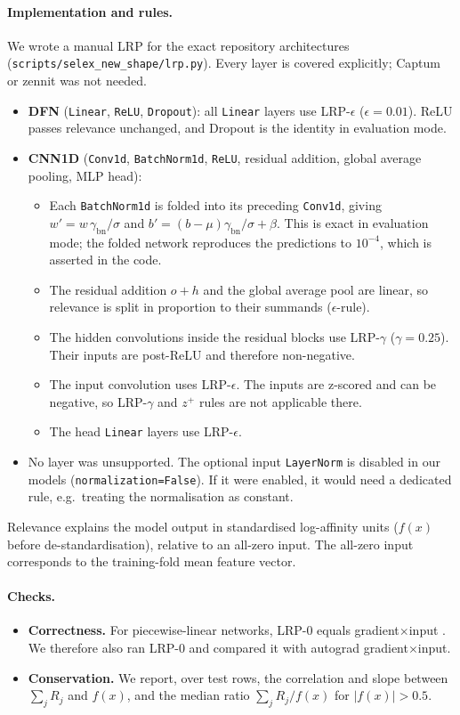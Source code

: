 \paragraph{Implementation and rules.} We wrote a manual LRP for the exact repository architectures (\texttt{scripts/selex\_new\_shape/lrp.py}). Every layer is covered explicitly; Captum or zennit was not needed.
\begin{itemize}
\item \textbf{DFN} (\texttt{Linear}, \texttt{ReLU}, \texttt{Dropout}): all \texttt{Linear} layers use LRP-$\epsilon$ ($\epsilon=0.01$). ReLU passes relevance unchanged, and Dropout is the identity in evaluation mode.
\item \textbf{CNN1D} (\texttt{Conv1d}, \texttt{BatchNorm1d}, \texttt{ReLU}, residual addition, global average pooling, MLP head):
  \begin{itemize}
  \item Each \texttt{BatchNorm1d} is folded into its preceding \texttt{Conv1d}, giving $w'=w\,\gamma_\mathrm{bn}/\sigma$ and $b'=(b-\mu)\gamma_\mathrm{bn}/\sigma+\beta$. This is exact in evaluation mode; the folded network reproduces the predictions to $10^{-4}$, which is asserted in the code.
  \item The residual addition $o+h$ and the global average pool are linear, so relevance is split in proportion to their summands ($\epsilon$-rule).
  \item The hidden convolutions inside the residual blocks use LRP-$\gamma$ ($\gamma=0.25$). Their inputs are post-ReLU and therefore non-negative.
  \item The input convolution uses LRP-$\epsilon$. The inputs are z-scored and can be negative, so LRP-$\gamma$ and $z^+$ rules are not applicable there.
  \item The head \texttt{Linear} layers use LRP-$\epsilon$.
  \end{itemize}
\item No layer was unsupported. The optional input \texttt{LayerNorm} is disabled in our models (\texttt{normalization=False}). If it were enabled, it would need a dedicated rule, e.g.\ treating the normalisation as constant.
\end{itemize}
Relevance explains the model output in standardised log-affinity units ($f(x)$ before de-standardisation), relative to an all-zero input. The all-zero input corresponds to the training-fold mean feature vector.

\paragraph{Checks.}
\begin{itemize}
\item \textbf{Correctness.} For piecewise-linear networks, LRP-0 equals gradient$\times$input \cite{ancona2018}. We therefore also ran LRP-0 and compared it with autograd gradient$\times$input.
\item \textbf{Conservation.} We report, over test rows, the correlation and slope between $\sum_j R_j$ and $f(x)$, and the median ratio $\sum_j R_j/f(x)$ for $|f(x)|>0.5$.
\end{itemize}

